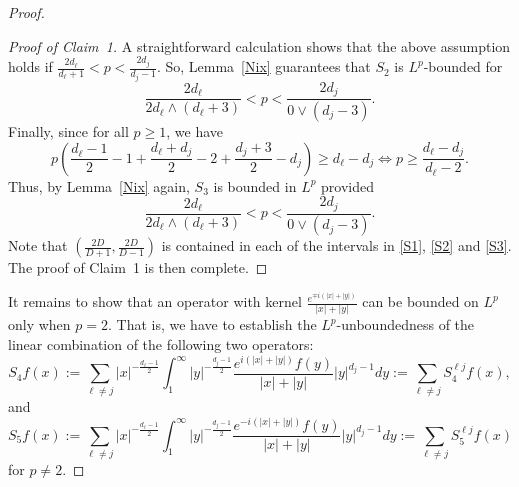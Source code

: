 \documentclass[10pt,a4paper]{amsart}
\begin{document}
\begin{proof}
\begin{proof}[Proof of Claim~1]
A straightforward calculation shows that the above assumption holds if $\frac{2d_\ell}{d_\ell+1}<p<\frac{2d_j}{d_j-1}$. So, Lemma~\ref{Nix} guarantees that $S_2$ is $L^p$-bounded for
\begin{equation}\label{S2}
    \frac{2d_\ell}{2d_\ell \wedge (d_\ell+3)} <p< \frac{2d_j}{0 \vee (d_j-3)}.
\end{equation}
Finally, since for all $p\ge 1$, we have
\begin{equation*}
    p \left( \frac{d_\ell-1}{2} - 1 + \frac{d_\ell+d_j}{2} - 2 + \frac{d_j+3}{2} - d_j \right) \ge d_\ell-d_j \iff p \ge \frac{d_\ell-d_j}{d_\ell-2}.
\end{equation*}
Thus, by Lemma~\ref{Nix} again, $S_3$ is bounded in $L^p$ provided 
\begin{equation}\label{S3}
    \frac{2d_\ell}{2d_\ell \wedge (d_\ell+3)} < p < \frac{2d_j}{0 \vee (d_j-3)}.
\end{equation}
Note that $\left( \frac{2D}{D+1}, \frac{2D}{D-1} \right)$ is contained in each of the intervals in \eqref{S1}, \eqref{S2} and \eqref{S3}. The proof of Claim~1 is then complete.
\end{proof}


It remains to show that an operator with kernel $\frac{e^{\mp i(|x|+|y|)}}{|x|+|y|}$ can be bounded on $L^p$ only when $p=2$. That is, we have to establish the $L^p$-unboundedness of the linear combination of the following two operators:
\begin{equation*}
S_4f(x) := \sum_{\ell \ne j}|x|^{-\frac{d_\ell-1}{2}} \int_1^\infty |y|^{-\frac{d_j-1}{2}} \frac{e^{i(|x|+|y|)}f(y)}{|x|+|y|} |y|^{d_j-1} dy:= \sum_{\ell \ne j}S_4^{\ell j}f(x), 
\end{equation*}
and
\begin{equation*}
S_5f(x):= \sum_{\ell \ne j} |x|^{-\frac{d_\ell-1}{2}} \int_1^\infty |y|^{-\frac{d_j-1}{2}} \frac{e^{-i(|x|+|y|)}f(y)}{|x|+|y|} |y|^{d_j-1} dy:= \sum_{\ell \ne j}S_5^{\ell j}f(x)
\end{equation*}
for $p \ne 2$.


\end{proof}
\end{document}
